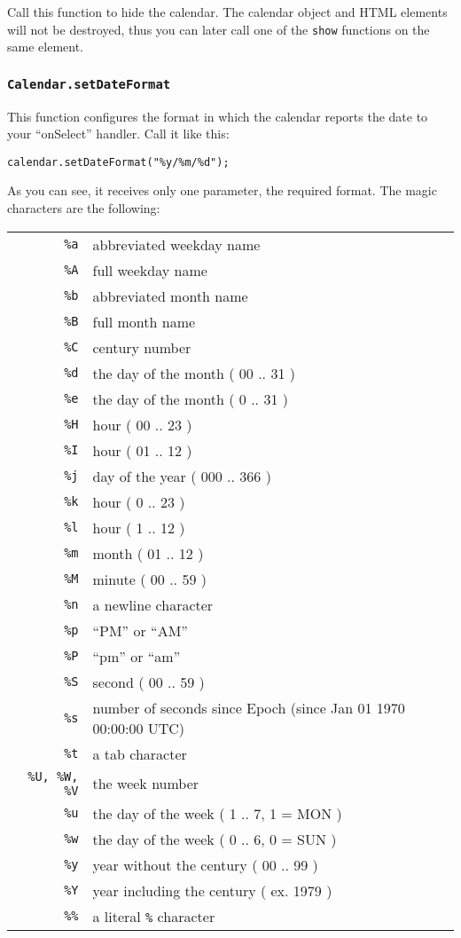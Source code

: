 \documentclass[a4paper,10pt]{article}
\begin{document}
Call this function to hide the calendar.  The calendar object and HTML elements
will not be destroyed, thus you can later call one of the \texttt{show}
functions on the same element.

\subsubsection{\texttt{Calendar.setDateFormat}}\label{sec:Calendar.setDateFormat}

This function configures the format in which the calendar reports the date to
your ``onSelect'' handler.  Call it like this:

\begin{verbatim}
calendar.setDateFormat("%y/%m/%d");
\end{verbatim}

As you can see, it receives only one parameter, the required format.  The magic
characters are the following:

\begin{tabular}{ r l }
\\
\texttt{\%a} & abbreviated weekday name \\
\texttt{\%A} & full weekday name \\
\texttt{\%b} & abbreviated month name \\
\texttt{\%B} & full month name \\
\texttt{\%C} & century number \\
\texttt{\%d} & the day of the month ( 00 .. 31 ) \\
\texttt{\%e} & the day of the month ( 0 .. 31 ) \\
\texttt{\%H} & hour ( 00 .. 23 ) \\
\texttt{\%I} & hour ( 01 .. 12 ) \\
\texttt{\%j} & day of the year ( 000 .. 366 ) \\
\texttt{\%k} & hour ( 0 .. 23 ) \\
\texttt{\%l} & hour ( 1 .. 12 ) \\
\texttt{\%m} & month ( 01 .. 12 ) \\
\texttt{\%M} & minute ( 00 .. 59 ) \\
\texttt{\%n} & a newline character \\
\texttt{\%p} & ``PM'' or ``AM'' \\
\texttt{\%P} & ``pm'' or ``am'' \\
\texttt{\%S} & second ( 00 .. 59 ) \\
\texttt{\%s} & number of seconds since Epoch (since Jan 01 1970 00:00:00 UTC) \\
\texttt{\%t} & a tab character \\
\texttt{\%U, \%W, \%V} & the week number\footnotemark\\
\texttt{\%u} & the day of the week ( 1 .. 7, 1 = MON )\\
\texttt{\%w} & the day of the week ( 0 .. 6, 0 = SUN )\\
\texttt{\%y} & year without the century ( 00 .. 99 )\\
\texttt{\%Y} & year including the century ( ex. 1979 )\\
\texttt{\%\%} & a literal \texttt{\%} character
\end{tabular}
\end{document}
